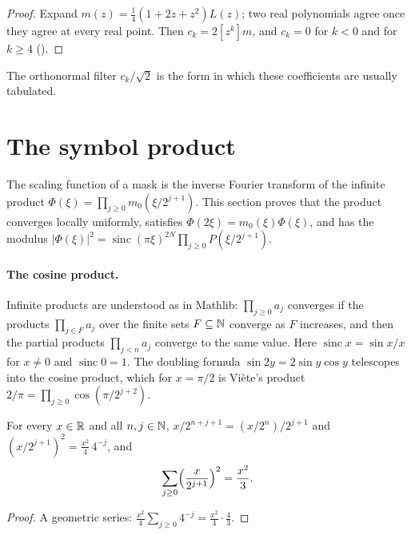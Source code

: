 \begin{proof}
\leanok
{}
Expand $m(z) = \frac14 (1 + 2z + z^2) L(z)$; two real polynomials agree once they agree at every
real point. Then $c_k = 2 [z^k] m$, and $c_k = 0$ for $k < 0$ and for $k \geq 4$
().
\end{proof}

The orthonormal filter $c_k/\sqrt 2$ is the form in which these coefficients are usually
tabulated.

\section{The symbol product}

The scaling function of a mask is the inverse Fourier transform of the infinite product
$\Phi(\xi) = \prod_{j \geq 0} m_0(\xi/2^{j+1})$. This section proves that the product converges
locally uniformly, satisfies $\Phi(2\xi) = m_0(\xi) \Phi(\xi)$, and has the modulus
$|\Phi(\xi)|^2 = \operatorname{sinc}(\pi\xi)^{2N} \prod_{j \geq 0} P(\xi/2^{j+1})$.

\paragraph{The cosine product.}
Infinite products are understood as in Mathlib: $\prod_{j \geq 0} a_j$ converges if the products
$\prod_{j \in F} a_j$ over the finite sets $F \subseteq \mathbb{N}$ converge as $F$ increases, and then
the partial products $\prod_{j<n} a_j$ converge to the same value. Here
$\operatorname{sinc} x = \sin x / x$ for $x \neq 0$ and $\operatorname{sinc} 0 = 1$. The doubling
formula $\sin 2y = 2 \sin y \cos y$ telescopes into the cosine product, which for $x = \pi/2$ is
Vi\`ete's product $2/\pi = \prod_{j \geq 0} \cos(\pi/2^{j+2})$.

\begin{lemma}
\label{lem:daub-dyadic}
\leanok
For every $x \in \mathbb{R}$ and all $n, j \in \mathbb{N}$, $x/2^{n+j+1} = (x/2^n)/2^{j+1}$ and
$(x/2^{j+1})^2 = \frac{x^2}{4} \, 4^{-j}$, and
\[
  \sum_{j \geq 0} \Bigl(\frac{x}{2^{j+1}}\Bigr)^2 = \frac{x^2}{3} .
\]
\end{lemma}

\begin{proof}
\leanok
A geometric series: $\frac{x^2}{4} \sum_{j \geq 0} 4^{-j} = \frac{x^2}{4} \cdot \frac43$.
\end{proof}

